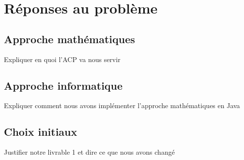 \section{Réponses au problème}

\subsection{Approche mathématiques}
Expliquer en quoi l'ACP va nous servir 

\subsection{Approche informatique}
Expliquer comment nous avons implémenter l'approche mathématiques en Java

\subsection{Choix initiaux}
Justifier notre livrable 1 et dire ce que nous avons changé